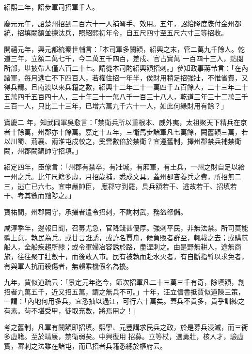 \begin{pinyinscope}
 紹熙二年，詔步軍司招軍千人。



 慶元元年，詔楚州招到二百六十一人補弩手、效用。五年，詔給降度牒付金州都統，招填闕額並揀汰兵，照紹熙初年令，自五尺四寸至五尺六寸三等招收。



 開禧元年，興元都統秦世輔言：「本司軍多闕額，紹興之末，管二萬九千餘人。乾道三年，立額二萬七千，今二萬五千四百，差戍、官占實萬
 一百四十三人，點閱所部，堪披帶人僅六百二十七。請從本司酌紹興額招刺。」參知政事蔣芾言：「在內諸軍，每月逃亡不下四百人，若權住招一年半，俟財用稍足招強壯，不惟省費，又得兵精。且南渡以來兵籍之數，紹興十二年二十一萬四千五百餘人，二十三年二十五萬四千五百四十人，三十年三十一萬八千一百三十八人，乾道三年三十二萬三千三百一人，只比二十三年，已增六萬九千六十一人，如此何緣財用有餘？」



 寶慶二
 年，知武岡軍吳愈言：「禁衛兵所以重根本、威外夷，太祖聚天下精兵在京者十餘萬，州郡亦十餘萬。嘉定十五年，三衛馬步諸軍凡七萬餘，闕舊額三萬，若以川蜀、荊襄、兩淮屯戍較之，奚啻數倍於禁衛？宜遵舊制，擇州郡禁兵補禁衛闕，州郡闕額帥守招填。」



 紹定四年，臣僚言：「州郡有禁卒，有壯城，有廂軍，有土兵，一州之財自足以給一州之兵。比年尺籍多虛，月招歲補，悉成文具。蓋州郡吝養兵之費，所招無二三，逃亡已六七。宜申嚴帥臣，
 應郡守到罷，具兵額若干、逃故若干、招填若干、考其數而黜陟之。」



 寶祐間，州郡闕守，承攝者遣令招刺，不詢材武，務盜帑儲。



 咸淳季年，邊報日聞，召募尤急，官降錢甚優厚。強刺平民，非無法禁。所司莫能體上意，執民為兵。或甘言誑誘，或詐名賈舟，候負販者群至，輒載之去；或購航船人，全船疾趨所隸；或令軍婦冶容誘於路，盡涅刺之。由是野無耕人，途無商旅，往往聚丁壯數十，而後敢入市。民有被執而赴水火者，有自斷指臂以求免者，
 有與軍人抗而殺傷者，無賴乘機假名為擾。



 九年，賈似道疏云：「景定元年迄今，節次招軍凡二十三萬三千有奇，除填額，創招者九萬五千，近又招五萬，謂之無兵不可。」十年，汪立信書抵賈似道陳三策，一謂：「內地何用多兵，宜悉抽以過江，可行六十萬矣。蓋兵不貴多，貴乎訓練之有素。茍不堪受甲，徒取充數，將焉用之！」



 考之舊制，凡軍有闕額即招填。熙寧、元豐講求民兵之政，於是募兵浸減，而三衙多虛籍。至於靖康，禁衛弱矣。中興復用
 招募。立等杖，選勇壯，核人才，驗虛實，審刺之法雖在諸屯，而已招者兵籍悉總於樞府云。



\end{pinyinscope}